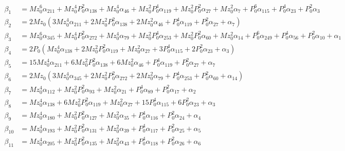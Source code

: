 \documentclass{article}
\begin{document}
\begin{align*}
\beta_{1} &= Mz_{0}^{6} \alpha_{211} + Mz_{0}^{4} P_{0}^{2} \alpha_{138} + Mz_{0}^{4} \alpha_{46} + Mz_{0}^{2} P_{0}^{4} \alpha_{119} + Mz_{0}^{2} P_{0}^{2} \alpha_{27} + Mz_{0}^{2} \alpha_{7} + P_{0}^{6} \alpha_{115} + P_{0}^{4} \alpha_{23} + P_{0}^{2} \alpha_{3} \\
\beta_{2} &= 2 Mz_{0} \left(3 Mz_{0}^{4} \alpha_{211} + 2 Mz_{0}^{2} P_{0}^{2} \alpha_{138} + 2 Mz_{0}^{2} \alpha_{46} + P_{0}^{4} \alpha_{119} + P_{0}^{2} \alpha_{27} + \alpha_{7}\right) \\
\beta_{3} &= Mz_{0}^{6} \alpha_{345} + Mz_{0}^{4} P_{0}^{2} \alpha_{272} + Mz_{0}^{4} \alpha_{79} + Mz_{0}^{2} P_{0}^{4} \alpha_{253} + Mz_{0}^{2} P_{0}^{2} \alpha_{60} + Mz_{0}^{2} \alpha_{14} + P_{0}^{6} \alpha_{249} + P_{0}^{4} \alpha_{56} + P_{0}^{2} \alpha_{10} + \alpha_{1} \\
\beta_{4} &= 2 P_{0} \left(Mz_{0}^{4} \alpha_{138} + 2 Mz_{0}^{2} P_{0}^{2} \alpha_{119} + Mz_{0}^{2} \alpha_{27} + 3 P_{0}^{4} \alpha_{115} + 2 P_{0}^{2} \alpha_{23} + \alpha_{3}\right) \\
\beta_{5} &= 15 Mz_{0}^{4} \alpha_{211} + 6 Mz_{0}^{2} P_{0}^{2} \alpha_{138} + 6 Mz_{0}^{2} \alpha_{46} + P_{0}^{4} \alpha_{119} + P_{0}^{2} \alpha_{27} + \alpha_{7} \\
\beta_{6} &= 2 Mz_{0} \left(3 Mz_{0}^{4} \alpha_{345} + 2 Mz_{0}^{2} P_{0}^{2} \alpha_{272} + 2 Mz_{0}^{2} \alpha_{79} + P_{0}^{4} \alpha_{253} + P_{0}^{2} \alpha_{60} + \alpha_{14}\right) \\
\beta_{7} &= Mz_{0}^{4} \alpha_{112} + Mz_{0}^{2} P_{0}^{2} \alpha_{93} + Mz_{0}^{2} \alpha_{21} + P_{0}^{4} \alpha_{89} + P_{0}^{2} \alpha_{17} + \alpha_{2} \\
\beta_{8} &= Mz_{0}^{4} \alpha_{138} + 6 Mz_{0}^{2} P_{0}^{2} \alpha_{119} + Mz_{0}^{2} \alpha_{27} + 15 P_{0}^{4} \alpha_{115} + 6 P_{0}^{2} \alpha_{23} + \alpha_{3} \\
\beta_{9} &= Mz_{0}^{4} \alpha_{180} + Mz_{0}^{2} P_{0}^{2} \alpha_{127} + Mz_{0}^{2} \alpha_{35} + P_{0}^{4} \alpha_{116} + P_{0}^{2} \alpha_{24} + \alpha_{4} \\
\beta_{10} &= Mz_{0}^{4} \alpha_{193} + Mz_{0}^{2} P_{0}^{2} \alpha_{131} + Mz_{0}^{2} \alpha_{39} + P_{0}^{4} \alpha_{117} + P_{0}^{2} \alpha_{25} + \alpha_{5} \\
\beta_{11} &= Mz_{0}^{4} \alpha_{205} + Mz_{0}^{2} P_{0}^{2} \alpha_{135} + Mz_{0}^{2} \alpha_{43} + P_{0}^{4} \alpha_{118} + P_{0}^{2} \alpha_{26} + \alpha_{6} \\

\end{align*}
\end{document}
